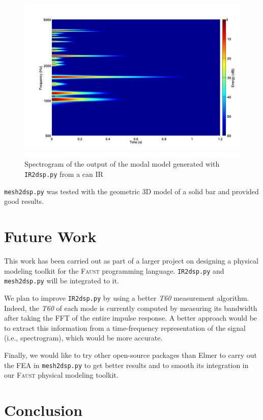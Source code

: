 \documentclass[11pt,a4paper]{article}
\newcommand{\f}{\textsc{Faust}}
\begin{document}
\begin{figure}[htbp]
  \centering
  \includegraphics[width=\columnwidth]{pictures/canModalModel}
  \caption{Spectrogram of the output of the modal model generated with \texttt{IR2dsp.py} from a can IR}
  \label{fig:spectro2}
\end{figure}

\texttt{mesh2dsp.py} was tested with the geometric 3D model of a solid bar and provided good results. 

\section{Future Work}
\label{sec:future}

This work has been carried out as part of a larger project on designing a physical modeling toolkit for the \f{} programming language. \texttt{IR2dsp.py} and \texttt{mesh2dsp.py} will be integrated to it.

We plan to improve \texttt{IR2dsp.py} by using a better \textit{T60} measurement algorithm. Indeed, the \textit{T60} of each mode is currently computed by measuring its bandwidth after taking the FFT of the entire impulse response. A better approach would be to extract this information from a time-frequency representation of the signal (i.e., spectrogram), which would be more accurate.

Finally, we would like to try other open-source packages than Elmer to carry out the FEA in \texttt{mesh2dsp.py} to get better results and to smooth its integration in our \f{} physical modeling toolkit.  

\section{Conclusion}
\end{document}
